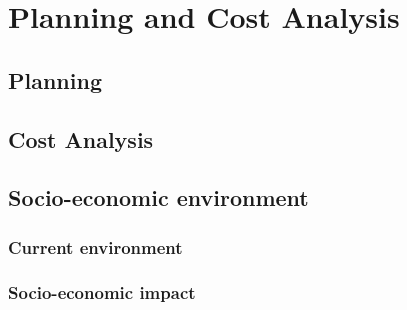 \chapter{Planning and Cost Analysis}\label{chap:planning}

\section{Planning}

\section{Cost Analysis}


\section{Socio-economic environment}

\subsection{Current environment}





\subsection{Socio-economic impact}


